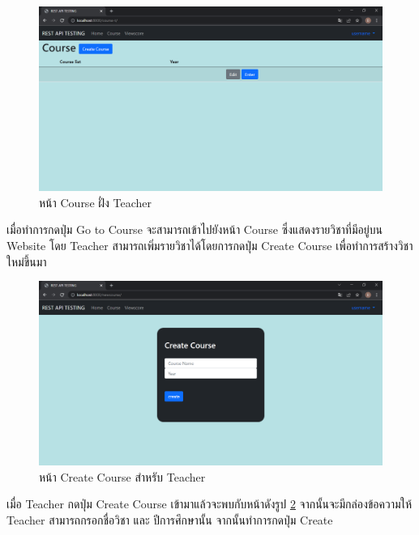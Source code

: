 \begin{figure}[H]
    \captionsetup{justification=centering}
    \centering
    \includegraphics[width=5in]{figures/chapter4/courseteacher.PNG}
    \caption{หน้า Course ฝั่ง Teacher}
    \label{figure:course}
\end{figure}
เมื่อทำการกดปุ่ม Go to Course จะสามารถเข้าไปยังหน้า Course ซึ่งแสดงรายวิชาที่มีอยู่บน Website โดย Teacher สามารถเพิ่มรายวิชาได้โดยการกดปุ่ม Create Course เพื่อทำการสร้างวิชาใหม่ขึ้นมา
\newpage

\begin{figure}[H]
    \captionsetup{justification=centering}
    \centering
    \includegraphics[width=5in]{figures/chapter4/createcourse.PNG}
    \caption{หน้า Create Course สำหรับ Teacher}
    \label{figure:createcourse}
\end{figure}
เมื่อ Teacher กดปุ่ม Create Course เข้ามาแล้วจะพบกับหน้าดังรูป \ref{figure:createcourse} จากนั้นจะมีกล่องข้อความให้ Teacher สามารถกรอกชื่อวิชา และ ปีการศึกษานั้น จากนั้นทำการกดปุ่ม Create

